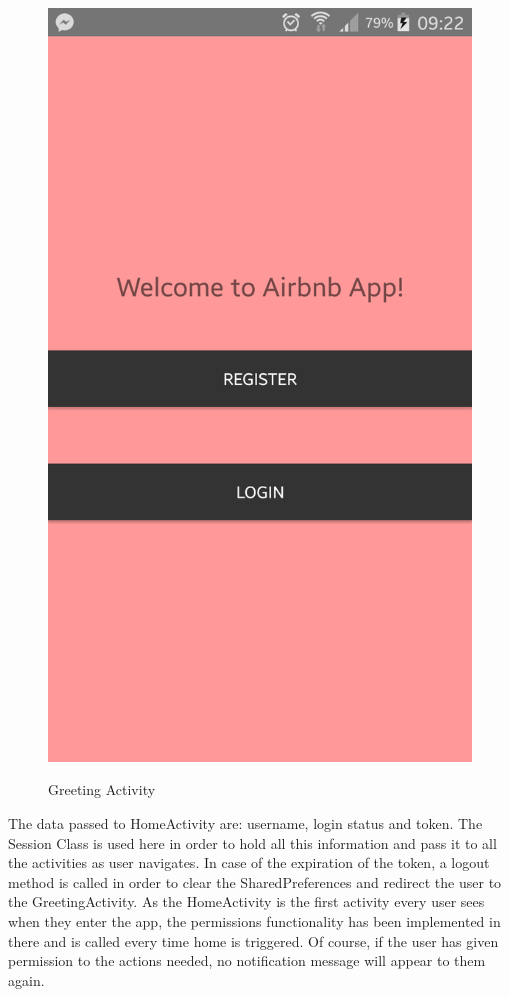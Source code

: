 \documentclass[12pt]{article}
\begin{document}
	\begin{figure} [H]
		\begin{center}
			\includegraphics [scale = 0.13] {01-greetingActivity.png}\\[1.0 cm]
			\caption{Greeting Activity}
		\end{center}
	\end{figure}
	
	The data passed to HomeActivity are: username, login status and token. The Session Class is used here in order to hold all this information and pass it to all the activities as user navigates. In case of the expiration of the token, a logout method is called in order to clear the SharedPreferences and redirect the user to the GreetingActivity. As the HomeActivity is the first activity every user sees when they enter the app, the permissions functionality has been implemented in there and is called every time home is triggered. Of course, if the user has given permission to the actions needed, no notification message will appear to them again.
	
\end{document}
